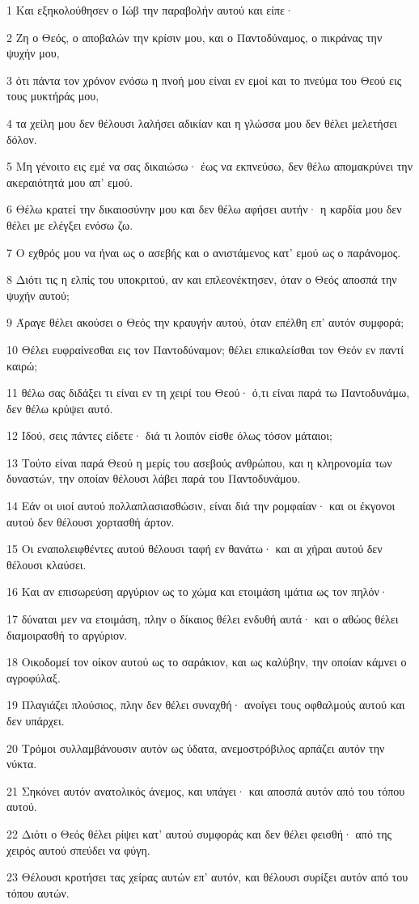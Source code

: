 \par 1 Και εξηκολούθησεν ο Ιώβ την παραβολήν αυτού και είπε·
\par 2 Ζη ο Θεός, ο αποβαλών την κρίσιν μου, και ο Παντοδύναμος, ο πικράνας την ψυχήν μου,
\par 3 ότι πάντα τον χρόνον ενόσω η πνοή μου είναι εν εμοί και το πνεύμα του Θεού εις τους μυκτήράς μου,
\par 4 τα χείλη μου δεν θέλουσι λαλήσει αδικίαν και η γλώσσα μου δεν θέλει μελετήσει δόλον.
\par 5 Μη γένοιτο εις εμέ να σας δικαιώσω· έως να εκπνεύσω, δεν θέλω απομακρύνει την ακεραιότητά μου απ' εμού.
\par 6 Θέλω κρατεί την δικαιοσύνην μου και δεν θέλω αφήσει αυτήν· η καρδία μου δεν θέλει με ελέγξει ενόσω ζω.
\par 7 Ο εχθρός μου να ήναι ως ο ασεβής και ο ανιστάμενος κατ' εμού ως ο παράνομος.
\par 8 Διότι τις η ελπίς του υποκριτού, αν και επλεονέκτησεν, όταν ο Θεός αποσπά την ψυχήν αυτού;
\par 9 Άραγε θέλει ακούσει ο Θεός την κραυγήν αυτού, όταν επέλθη επ' αυτόν συμφορά;
\par 10 Θέλει ευφραίνεσθαι εις τον Παντοδύναμον; θέλει επικαλείσθαι τον Θεόν εν παντί καιρώ;
\par 11 θέλω σας διδάξει τι είναι εν τη χειρί του Θεού· ό,τι είναι παρά τω Παντοδυνάμω, δεν θέλω κρύψει αυτό.
\par 12 Ιδού, σεις πάντες είδετε· διά τι λοιπόν είσθε όλως τόσον μάταιοι;
\par 13 Τούτο είναι παρά Θεού η μερίς του ασεβούς ανθρώπου, και η κληρονομία των δυναστών, την οποίαν θέλουσι λάβει παρά του Παντοδυνάμου.
\par 14 Εάν οι υιοί αυτού πολλαπλασιασθώσιν, είναι διά την ρομφαίαν· και οι έκγονοι αυτού δεν θέλουσι χορτασθή άρτον.
\par 15 Οι εναπολειφθέντες αυτού θέλουσι ταφή εν θανάτω· και αι χήραι αυτού δεν θέλουσι κλαύσει.
\par 16 Και αν επισωρεύση αργύριον ως το χώμα και ετοιμάση ιμάτια ως τον πηλόν·
\par 17 δύναται μεν να ετοιμάση, πλην ο δίκαιος θέλει ενδυθή αυτά· και ο αθώος θέλει διαμοιρασθή το αργύριον.
\par 18 Οικοδομεί τον οίκον αυτού ως το σαράκιον, και ως καλύβην, την οποίαν κάμνει ο αγροφύλαξ.
\par 19 Πλαγιάζει πλούσιος, πλην δεν θέλει συναχθή· ανοίγει τους οφθαλμούς αυτού και δεν υπάρχει.
\par 20 Τρόμοι συλλαμβάνουσιν αυτόν ως ύδατα, ανεμοστρόβιλος αρπάζει αυτόν την νύκτα.
\par 21 Σηκόνει αυτόν ανατολικός άνεμος, και υπάγει· και αποσπά αυτόν από του τόπου αυτού.
\par 22 Διότι ο Θεός θέλει ρίψει κατ' αυτού συμφοράς και δεν θέλει φεισθή· από της χειρός αυτού σπεύδει να φύγη.
\par 23 Θέλουσι κροτήσει τας χείρας αυτών επ' αυτόν, και θέλουσι συρίξει αυτόν από του τόπου αυτών.

